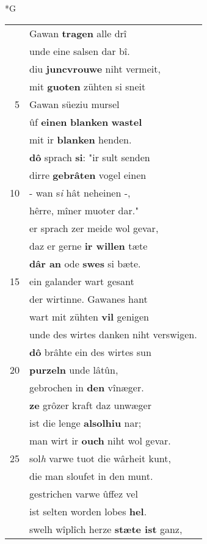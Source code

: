 \documentclass[8pt,a4paper,notitlepage]{article}
\begin{document}
\begin{table}[ht]
\begin{minipage}[t]{0.5\linewidth}
\small
\begin{center}*G
\end{center}
\begin{tabular}{rl}
 & Gawan \textbf{tragen} alle drî\\ 
 & unde eine salsen dar bî.\\ 
 & diu \textbf{juncvrouwe} niht vermeit,\\ 
 & mit \textbf{guoten} zühten si sneit\\ 
5 & Gawan süeziu mursel\\ 
 & ûf \textbf{einen} \textbf{blanken} \textbf{wastel}\\ 
 & mit ir \textbf{blanken} henden.\\ 
 & \textbf{dô} sprach \textbf{si}: "ir sult senden\\ 
 & dirre \textbf{gebrâten} vogel einen\\ 
10 & - wan s\textit{i} hât neheinen -,\\ 
 & hêrre, mîner muoter dar."\\ 
 & er sprach zer meide wol gevar,\\ 
 & daz er gerne \textbf{ir willen} tæte\\ 
 & \textbf{dâr an} ode \textbf{swes} si bæte.\\ 
15 & ein galander wart gesant\\ 
 & der wirtinne. Gawanes hant\\ 
 & wart mit zühten \textbf{vil} genigen\\ 
 & unde des wirtes danken niht verswigen.\\ 
 & \textbf{dô} brâhte ein des wirtes sun\\ 
20 & \textbf{purzeln} unde lâtûn,\\ 
 & gebrochen in \textbf{den} vînæger.\\ 
 & \textbf{ze} grôzer kraft daz unwæger\\ 
 & ist die lenge \textbf{al}\textbf{solhiu} nar;\\ 
 & man wirt ir \textbf{ouch} niht wol gevar.\\ 
25 & sol\textit{h} varwe tuot die wârheit kunt,\\ 
 & die man sloufet in den munt.\\ 
 & gestrichen varwe ûffez vel\\ 
 & ist selten worden lobes \textbf{hel}.\\ 
 & swelh wîplîch herze \textbf{stæte ist} ganz,\\ 

\end{tabular}
\end{minipage}
\end{table}
\end{document}
